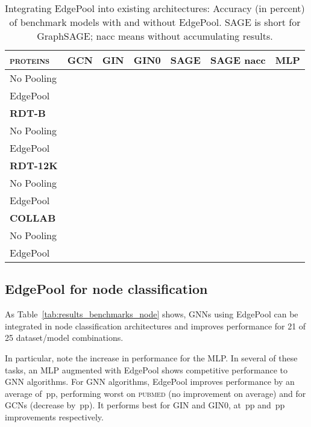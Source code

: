 \documentclass{article}
\newcommand{\tableref}[1]{Table~\ref{#1}}
\newcommand{\edgepool}{EdgePool}
\newcommand{\datasetname}[1]{\textsc{#1}}
\newcommand{\pubmed}{\datasetname{pubmed}}
\newcommand{\pp}{\,\gls{pp}}
\begin{document}
\begin{table}
	\centering
	\caption{Integrating \edgepool{} into existing architectures: Accuracy (in percent) of benchmark models with and without \edgepool{}. SAGE is short for GraphSAGE; nacc means without accumulating results.} 


\begin{tabular}{lrrrrrr}
	\toprule
	\textbf{\datasetname{proteins}} & GCN              & GIN                   & GIN0                      & SAGE                  & SAGE nacc              & MLP \\ \midrule
	No Pooling                 &         &         &            &         &  & \\
	\edgepool{}                &  &  &      &  &         & \\
	
	\toprule
	\textbf{\datasetname{RDT-B}} &&&&&&\\ \midrule
	No Pooling                 &         &         &             &         &         & \\
	\edgepool{}                &  &  &      &  &  & \\
	
	\toprule
	\textbf{\datasetname{RDT-12K}} & &&&&& \\ \midrule
	No Pooling                 &  &  &      &         &         & \\
	\edgepool{}                &         &         &             &  &  & \\
	
	\toprule
	\textbf{\datasetname{COLLAB}} & &&&&&\\ \midrule
	No Pooling                 &    &  &  &  &  & \\
	\edgepool{}                &    &  &       &  &  & \\

\end{tabular} 	\label{tab:results_benchmarks}
\end{table}

\subsection{\edgepool{} for node classification}

As \tableref{tab:results_benchmarks_node} shows, \glspl{GNN} using \edgepool{} can be integrated in node classification architectures and improves performance for 21 of 25 dataset/model combinations.

In particular, note the increase in performance for the \gls{MLP}. In several of these tasks, an \gls{MLP} augmented with \edgepool{} shows competitive performance to \gls{GNN} algorithms. For \gls{GNN} algorithms, \edgepool{} improves performance by an average of \pp{}, performing worst on \pubmed{} (no improvement on average) and for \glspl{GCN} (decrease by \pp{}). It performs best for GIN and GIN0, at \pp{} and \pp{} improvements respectively.
\end{document}
